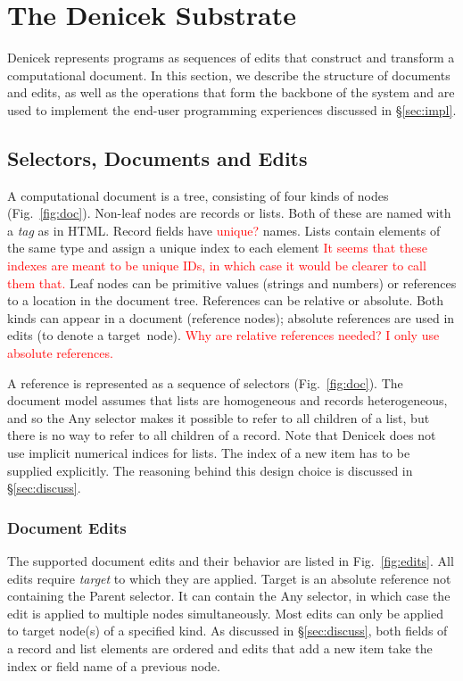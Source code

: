 \documentclass[sigconf,anonymous,screen]{acmart}
\newcommand{\ident}[1]{{\sffamily #1}}
\newcommand{\note}[1]{\textcolor{red}{#1}}
\begin{document}

\section{The Denicek Substrate}
\label{sec:system}
Denicek represents programs as sequences of edits that construct and transform a computational
document. In this section, we describe the structure of documents and edits, as well as the
operations that form the backbone of the system and are used to implement the
end-user programming experiences discussed in \S\ref{sec:impl}.


\subsection{Selectors, Documents and Edits}
A computational document is a tree, consisting of four kinds of nodes (Fig.~\ref{fig:doc}).
Non-leaf nodes are records or lists. Both of these are named with a \emph{tag} as in HTML. Record fields have \note{unique?} names. Lists contain elements of the same type and assign a unique index to each element \note{It seems that these indexes are meant to be unique IDs, in which case it would be clearer to call them that.}
Leaf nodes can be primitive values (strings and numbers) or references to a location in the document tree.
References can be relative or absolute. Both kinds can appear in a
document (reference nodes); absolute references are used in edits (to denote a target~node).
\note{Why are relative references needed? I only use absolute references.}

A reference is represented as a sequence of selectors (Fig.~\ref{fig:doc}).
The document model assumes that lists are homogeneous and records heterogeneous, and so the
\ident{Any} selector makes it possible to refer to all children of a list, but there is no
way to refer to all children of a record. Note that Denicek does not use implicit numerical
indices for lists. The index of a new item has to be supplied explicitly. The reasoning behind
this design choice is discussed in \S\ref{sec:discuss}.

\subsubsection*{Document Edits}
The supported document edits and their behavior are listed in Fig.~\ref{fig:edits}. All edits
require \emph{target} to which they are applied. Target is an absolute reference not containing the
\ident{Parent} selector. It can contain the \ident{Any} selector, in which case the edit is applied
to multiple nodes simultaneously. Most edits can only be applied to target node(s) of a specified
kind. As discussed in \S\ref{sec:discuss}, both fields of a record and list elements are ordered
and edits that add a new item take the index or field name of a previous node.
\end{document}

